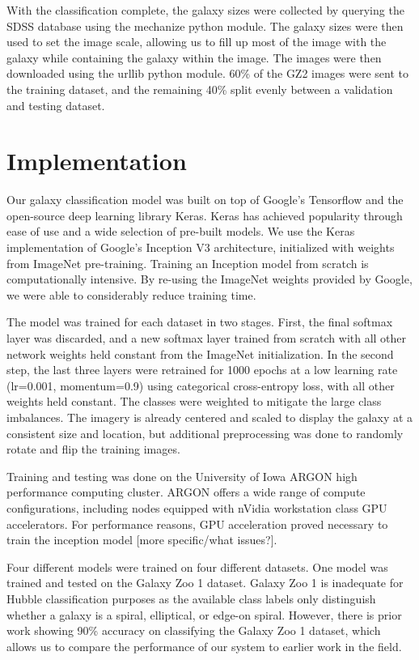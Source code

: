 \documentclass{article}
\begin{document}
With the classification complete, the galaxy sizes were collected by querying the SDSS database using the mechanize python module. The galaxy sizes were then used to set the image scale, allowing us to fill up most of the image with the galaxy while containing the galaxy within the image. The images were then downloaded using the urllib python module. 60\% of the GZ2 images were sent to the training dataset, and the remaining 40\% split evenly between a validation and testing dataset.


\section{Implementation}
Our galaxy classification model was built on top of Google’s Tensorflow and the open-source deep learning library Keras. Keras has achieved popularity through ease of use and a wide selection of pre-built models. We use the Keras implementation of Google’s Inception V3 architecture, initialized with weights from ImageNet pre-training. Training an Inception model from scratch is computationally intensive. By re-using the ImageNet weights provided by Google, we were able to considerably reduce training time. 

The model was trained for each dataset in two stages. First, the final softmax layer was discarded, and a new softmax layer trained from scratch with all other network weights held constant from the ImageNet initialization. In the second step, the last three layers were retrained for 1000 epochs at a low learning rate (lr=0.001, momentum=0.9) using categorical cross-entropy loss, with all other weights held constant. The classes were weighted to mitigate the large class imbalances. The imagery is already centered and scaled to display the galaxy at a consistent size and location, but additional preprocessing was done to randomly rotate and flip the training images.

Training and testing was done on the University of Iowa ARGON high performance computing cluster. ARGON offers a wide range of compute configurations, including nodes equipped with nVidia workstation class GPU accelerators. For performance reasons, GPU acceleration proved necessary to train the inception model [more specific/what issues?]. 

Four different models were trained on four different datasets.  One model was trained and tested on the Galaxy Zoo 1 dataset. Galaxy Zoo 1 is inadequate for Hubble classification purposes as the available class labels only distinguish whether a galaxy is a spiral, elliptical, or edge-on spiral.  However, there is prior work \cite{2004MNRAS.349...87D} showing 90\% accuracy on classifying the Galaxy Zoo 1 dataset, which allows us to compare the performance of our system to earlier work in the field.
\end{document}
